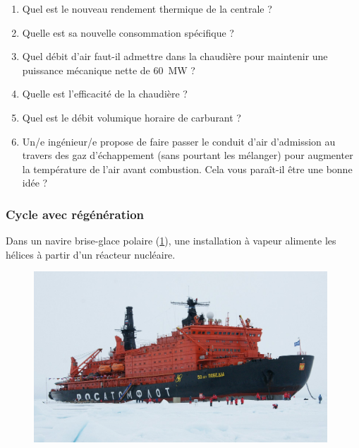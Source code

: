 	\begin{enumerate}
		\item Quel est le nouveau rendement thermique de la centrale ?
		\item Quelle est sa nouvelle consommation spécifique ?
		\item Quel débit d’air faut-il admettre dans la chaudière pour maintenir une puissance mécanique nette de \SI{60}{\mega\watt} ?
		\item Quelle est l’efficacité de la chaudière ?
		\item Quel est le débit volumique horaire de carburant ?
		\item Un/e ingénieur/e propose de faire passer le conduit d’air d’admission au travers des gaz d’échappement (sans pourtant les mélanger) pour augmenter la température de l’air avant combustion. Cela vous paraît-il être une bonne idée ?
	\end{enumerate}
	

\subsubsection{Cycle avec régénération}
\label{exo_brise_glace}

	Dans un navire brise-glace polaire (\cref{fig_50letpodeby}), une installation à vapeur alimente les hélices à partir d’un réacteur nucléaire.

	\begin{figure}
		\begin{center}
			\includegraphics[width=11cm]{images/50letpodeby.jpg}
		\end{center}
		\label{fig_50letpodeby}
	\end{figure}

